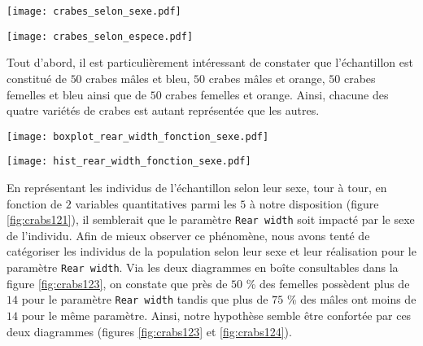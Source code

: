 \documentclass{article}
\begin{document}
\begin{multicols}{2}

\begingroup
    \centering
   \texttt{[image: crabes\_selon\_sexe.pdf]}
    \label{fig:crabs121}
\endgroup

\begingroup
    \centering
   \texttt{[image: crabes\_selon\_espece.pdf]}
    \label{fig:crabs122}
\endgroup


Tout d'abord, il est particulièrement intéressant de constater que l'échantillon est constitué de $50$ crabes mâles et bleu, $50$ crabes mâles et orange, $50$ crabes femelles et bleu ainsi que de $50$ crabes femelles et orange. Ainsi, chacune des quatre variétés de crabes est autant représentée que les autres.   


\begingroup
    \centering
   \texttt{[image: boxplot\_rear\_width\_fonction\_sexe.pdf]}
    \label{fig:crabs123}
\endgroup

\begingroup
    \centering
   \texttt{[image: hist\_rear\_width\_fonction\_sexe.pdf]}
    \label{fig:crabs124}
\endgroup


En représentant les individus de l'échantillon selon leur sexe, tour à tour, en fonction de $2$ variables quantitatives parmi les $5$ à notre disposition (figure \ref{fig:crabs121}), il semblerait que le paramètre \texttt{Rear width} soit impacté par le sexe de l'individu. Afin de mieux observer ce phénomène, nous avons tenté de catégoriser les individus de la population selon leur sexe et leur réalisation pour le paramètre \texttt{Rear width}. Via les deux diagrammes en boîte consultables dans la figure \ref{fig:crabs123}, on constate que près de $50$ \% des femelles possèdent plus de $14$ pour le paramètre \texttt{Rear width} tandis que plus de $75$ \% des mâles ont moins de $14$ pour le même paramètre. Ainsi, notre hypothèse semble être confortée par ces deux diagrammes (figures \ref{fig:crabs123} et \ref{fig:crabs124}).


\end{multicols}
\end{document}
